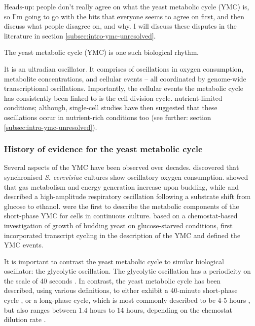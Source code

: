 Heads-up: people don't really agree on what the yeast metabolic cycle (YMC) is, so I'm going to go with the bits that everyone seems to agree on first, and then discuss what people disagree on, and why.
I will discuss these disputes in the literature in section \ref{subsec:intro-ymc-unresolved}.

The yeast metabolic cycle (YMC) is one such biological rhythm.

It is an ultradian oscillator.
It comprises of oscillations in oxygen consumption, metabolite concentrations, and cellular events -- all coordinated by genome-wide transcriptional oscillations.
Importantly, the cellular events the metabolic cycle has consistently been linked to is the cell division cycle.
nutrient-limited conditions;
although, single-cell studies have then suggested that these oscillations occur in nutrient-rich conditions too (see further: section \ref{subsec:intro-ymc-unresolved}).

\subsubsection{History of evidence for the yeast metabolic cycle}
\label{subsubsec:intro-ymc-definition-history}

Several aspects of the YMC have been observed over decades.
\citet{nosohSYNCHRONIZATIONBUDDINGCYCLE1962} discovered that synchronised \emph{S. cerevisiae} cultures show oscillatory oxygen consumption.
\citet{kasparvonmeyenburgEnergeticsBuddingCycle1969} showed that gas metabolism and energy generation increase upon budding, while and \citet{mochanRespiratoryOscillationsAdapting1973} described a high-amplitude respiratory oscillation following a substrate shift from glucose to ethanol.
\citet{satroutdinovOscillatoryMetabolismSaccharomyces1992} were the first to describe the metabolic components of the short-phase YMC for cells in continuous culture.
\citet{tuLogicYeastMetabolic2005} based on a chemostat-based investigation of growth of budding yeast on glucose-starved conditions,
first incorporated transcript cycling in the description of the YMC and defined the YMC events.

It is important to contrast the yeast metabolic cycle to similar biological oscillator: the glycolytic oscillation.
The glycolytic oscillation has a periodicity on the scale of 40 seconds \citep{olsenRegulationGlycolyticOscillations2009}.
In contrast, the yeast metabolic cycle has been described, using various definitions, to either exhibit a 40-minute short-phase cycle \citep{lloydUltradianMetronomeTimekeeper2005, liRapidGenomescaleResponse2006, lloydRedoxRhythmicityClocks2007}, or a long-phase cycle, which is most commonly described to be 4-5 hours \citep{tuLogicYeastMetabolic2005, tuCyclicChangesMetabolic2007}, but also ranges between 1.4 hours to 14 hours, depending on the chemostat dilution rate \citep{beuseEffectDilutionRate1998, oneillEukaryoticCellBiology2020}.

